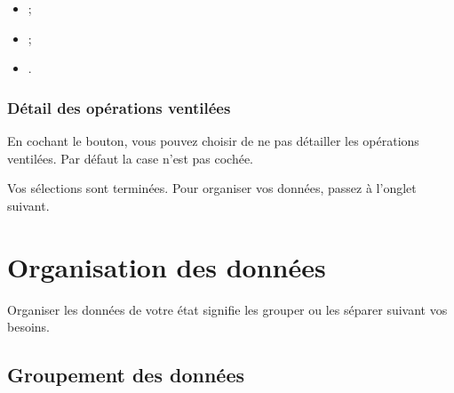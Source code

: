 \begin{itemize}
	\item {} ;
	\item {} ;
	\item {}.
\end{itemize} 


\subsubsection{Détail des opérations ventilées}

En cochant le bouton, vous pouvez choisir de ne pas détailler les opérations ventilées. Par défaut la case n'est pas cochée.

\ifIllustration
\else
\fi

Vos sélections sont terminées. Pour organiser vos données, passez à l'onglet suivant.


\section{Organisation des données\label{reportscreation-organisation}}


Organiser les données de votre état signifie les grouper ou les séparer suivant vos besoins.


\subsection{Groupement des données\label{reportscreation-organisation-group}}

